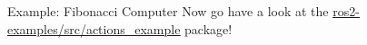\begin{frame}{Example: Fibonacci Computer}
Now go have a look at the \href{https://github.com/IntelligentSystemsLabUTV/ros2-examples/tree/galactic/src/actions_example}{\color{blue}\underline{ros2-examples/src/actions\_example}} package!
\end{frame}

